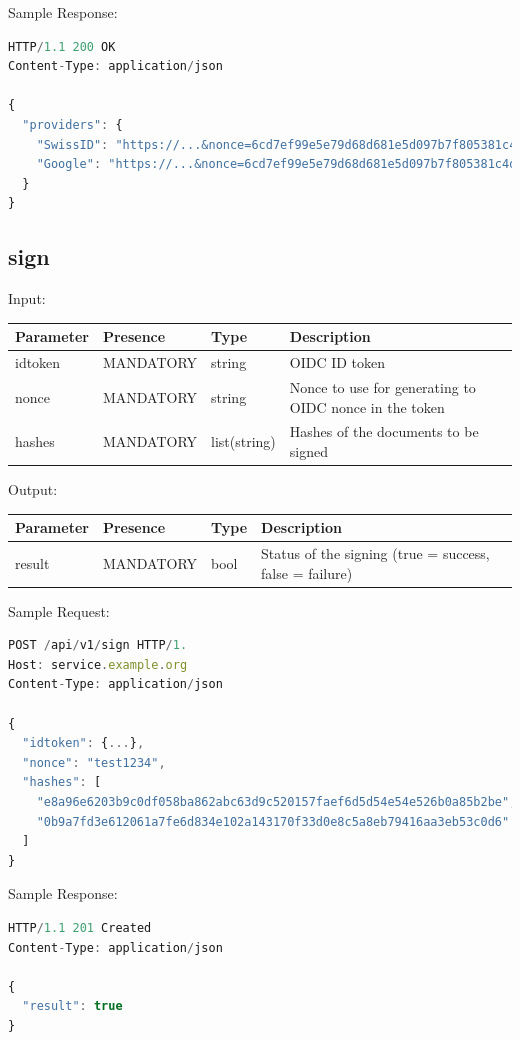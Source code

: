 Sample Response:

\begin{lstlisting}[caption={login response}, captionpos=b, language=JavaScript, label={lst:loginresponse}]
HTTP/1.1 200 OK
Content-Type: application/json

{
  "providers": {
    "SwissID": "https://...&nonce=6cd7ef99e5e79d68d681e5d097b7f805381c4d013152fa3f26d06bd728ae49fa",
    "Google": "https://...&nonce=6cd7ef99e5e79d68d681e5d097b7f805381c4d013152fa3f26d06bd728ae49fa"
  }
}
\end{lstlisting}

\subsection{sign}
Input:

\begin{tabular}{|l|l|l|l|}
	\hline
	Parameter & Presence & Type & Description \\ \hline
	idtoken & MANDATORY & string & OIDC ID token \\ \hline
	nonce & MANDATORY & string & Nonce to use for generating to OIDC nonce in the token \\ \hline
	hashes & MANDATORY & list(string) & Hashes of the documents to be signed \\ \hline
\end{tabular}

Output:

\begin{tabular}{|l|l|l|l|}
	\hline
	Parameter & Presence & Type & Description \\ \hline
	result & MANDATORY & bool & Status of the signing (true = success, false = failure) \\ \hline
\end{tabular}

Sample Request:
\begin{lstlisting}[caption={sign request}, captionpos=b, language=JavaScript, label={lst:signrequest}]
POST /api/v1/sign HTTP/1.
Host: service.example.org
Content-Type: application/json

{
  "idtoken": {...},
  "nonce": "test1234",
  "hashes": [
    "e8a96e6203b9c0df058ba862abc63d9c520157faef6d5d54e54e526b0a85b2be",
    "0b9a7fd3e612061a7fe6d834e102a143170f33d0e8c5a8eb79416aa3eb53c0d6"
  ]
}
\end{lstlisting}

Sample Response:

\begin{lstlisting}[caption={sign response}, captionpos=b, language=JavaScript, label={lst:signresponse}]
HTTP/1.1 201 Created
Content-Type: application/json

{
  "result": true
}
\end{lstlisting}

